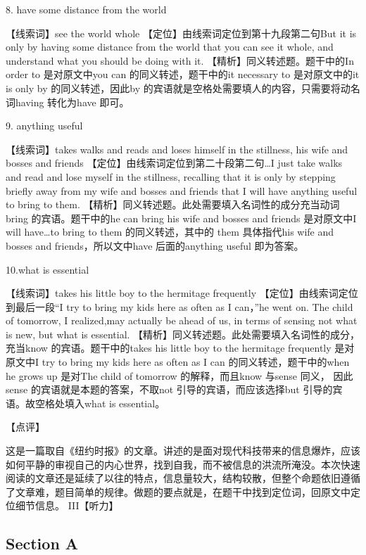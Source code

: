 \documentclass[UTF8,11pt]{ctexart}
\begin{document}
8. have some distance from the world


【线索词】see the world whole 【定位】由线索词定位到第十九段第二句But it is only by having some distance from the world that you can see it whole, and understand what you should be doing with it. 【精析】同义转述题。题干中的In order to 是对原文中you can 的同义转述，题干中的it necessary to 是对原文中的it is only by 的同义转述，因此by 的宾语就是空格处需要填人的内容，只需要将动名词having 转化为have 即可。


9. anything useful


【线索词】takes walks and reads and loses himself in the stillness, his wife and bosses and friends 【定位】由线索词定位到第二十段第二句…I just take walks and read and lose myself in the stillness, recalling that it is only by stepping briefly away from my wife and bosses and friends that I will have anything useful to bring to them. 【精析】同义转述题。此处需要填入名词性的成分充当动词bring 的宾语。题干中的he can bring his wife and bosses and friends 是对原文中I will have…to bring to them 的同义转述，其中的 them 具体指代his wife and bosses and friends，所以文中have 后面的anything useful 即为答案。


10.what is essential


【线索词】takes his little boy to the hermitage frequently 【定位】由线索词定位到最后一段“I try to bring my kids here as often as I can，”he went on. The child of tomorrow, I realized,may actually be ahead of us, in terms of sensing not what is new, but what is essential. 【精析】同义转述题。此处需要填入名词性的成分，充当know 的宾语。题干中的takes his little boy to the hermitage frequently 是对原文中I try to bring my kids here as often as I can 的同义转述，题干中的when he grows up 是对The child of tomorrow 的解释，而且know 与sense 同义， 因此sense 的宾语就是本题的答案，不取not 引导的宾语，而应该选择but 引导的宾语。故空格处填入what is essential。


【点评】


这是一篇取自《纽约时报》的文章。讲述的是面对现代科技带来的信息爆炸，应该如何平静的审视自己的内心世界，找到自我，而不被信息的洪流所淹没。本次快速阅读的文章还是延续了以往的特点，信息量较大，结构较散，但整个命题依旧遵循了文章难，题目简单的规律。做题的要点就是，在题干中找到定位词，回原文中定位细节信息。 III【听力】


\subsection*{Section A}
\end{document}
